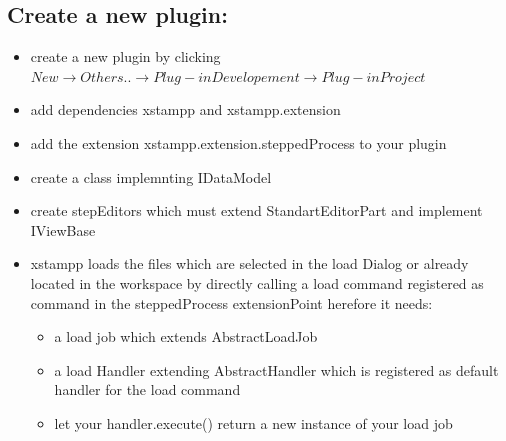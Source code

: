 \subsection{Create a new plugin:}
\begin{itemize}
\item create a new plugin by clicking $New\rightarrow Others..\rightarrow Plug-in Developement\rightarrow Plug-in Project$
\item add dependencies xstampp and xstampp.extension
\item add the extension xstampp.extension.steppedProcess to your plugin
\item create a class implemnting IDataModel
\item create stepEditors which must extend StandartEditorPart and implement IViewBase
\item xstampp loads the files which are selected in the load Dialog or already located in the workspace 
	  by directly calling a load command registered as command in the steppedProcess extensionPoint herefore it needs:
	\begin{itemize}
	\item a load job which extends AbstractLoadJob
	\item a load Handler extending AbstractHandler which is registered as default handler for the load command 
	\item let your handler.execute() return a new instance of your load job
	\end{itemize}
\end{itemize}